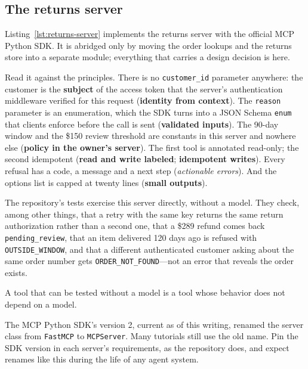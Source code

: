 \subsection{The returns server}

Listing~\ref{lst:returns-server} implements the returns server with the official MCP Python SDK. It is abridged only by moving the order lookups and the returns store into a separate module; everything that carries a design decision is here.



Read it against the principles. There is no \texttt{customer\_id} parameter anywhere: the customer is the \textbf{subject} of the access token that the server's authentication middleware verified for this request (\textbf{identity from context}). The \texttt{reason} parameter is an enumeration, which the SDK turns into a JSON Schema \texttt{enum} that clients enforce before the call is sent (\textbf{validated inputs}). The 90-day window and the \$150 review threshold are constants in this server and nowhere else (\textbf{policy in the owner's server}). The first tool is annotated read-only; the second idempotent (\textbf{read and write labeled}; \textbf{idempotent writes}). Every refusal has a code, a message and a next step (\emph{actionable errors}). And the options list is capped at twenty lines (\textbf{small outputs}).

The repository's tests exercise this server directly, without a model. They check, among other things, that a retry with the same key returns the same return authorization rather than a second one, that a \$289 refund comes back \texttt{pending\_review}, that an item delivered 120 days ago is refused with \texttt{OUTSIDE\_WINDOW}, and that a different authenticated customer asking about the same order number gets \texttt{ORDER\_NOT\_FOUND}---not an error that reveals the order exists. \begin{keyidea}
A tool that can be tested without a model is a tool whose behavior does not depend on a model.
\end{keyidea}

\begin{designnote}
The MCP Python SDK's version 2, current as of this writing, renamed the server class from \texttt{FastMCP} to \texttt{MCPServer}. Many tutorials still use the old name. Pin the SDK version in each server's requirements, as the repository does, and expect renames like this during the life of any agent system.
\end{designnote}

